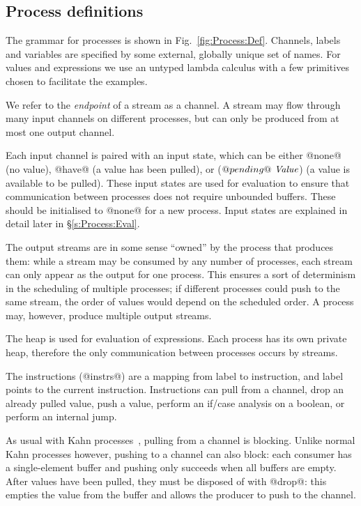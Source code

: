 \clearpage{}
\subsection{Process definitions}



The grammar for processes is shown in Fig.~\ref{fig:Process:Def}.
Channels, labels and variables are specified by some external, globally unique set of names.
For values and expressions we use an untyped lambda calculus with a few primitives chosen to facilitate the examples.

We refer to the \emph{endpoint} of a stream as a channel.
A stream may flow through many input channels on different processes, but can only be produced from at most one output channel.

Each input channel is paired with an input state, which can be either @none@ (no value), @have@ (a value has been pulled), or ($@pending@~\textit{Value}$) (a value is available to be pulled).
These input states are used for evaluation to ensure that communication between processes does not require unbounded buffers.
These should be initialised to @none@ for a new process.
Input states are explained in detail later in \S\ref{s:Process:Eval}.

The output streams are in some sense ``owned'' by the process that produces them: while a stream may be consumed by any number of processes, each stream can only appear as the output for one process.
This ensures a sort of determinism in the scheduling of multiple processes; if different processes could push to the same stream, the order of values would depend on the scheduled order.
A process may, however, produce multiple output streams.

The heap is used for evaluation of expressions.
Each process has its own private heap, therefore the only communication between processes occurs by streams.

The instructions (@instrs@) are a mapping from label to instruction, and label points to the current instruction.
Instructions can pull from a channel, drop an already pulled value, push a value, perform an if/case analysis on a boolean, or perform an internal jump.

As usual with Kahn processes~\cite{kahn1976coroutines}, pulling from a channel is blocking.
Unlike normal Kahn processes however, pushing to a channel can also block: each consumer has a single-element buffer and pushing only succeeds when all buffers are empty.
After values have been pulled, they must be disposed of with @drop@: this empties the value from the buffer and allows the producer to push to the channel.

